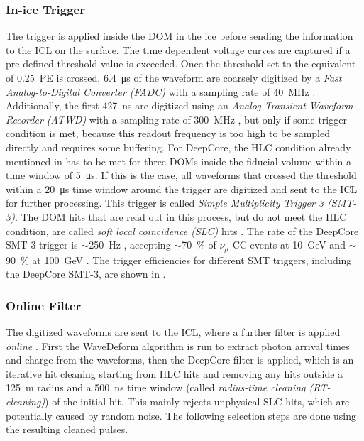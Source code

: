 \subsubsection{In-ice Trigger} 

The trigger is applied inside the DOM in the ice before sending the information to the ICL on the surface. The time dependent voltage curves are captured if a pre-defined threshold value is exceeded. Once the threshold set to the equivalent of \SI{0.25}{PE} is crossed, \SI{6.4}{\micro\second} of the waveform are coarsely digitized by a \textit{Fast Analog-to-Digital Converter (FADC)} with a sampling rate of \SI{40}{\mega\hertz} . Additionally, the first \SI{427}{\nano\second} are digitized using an \textit{Analog Transient Waveform Recorder (ATWD)} with a sampling rate of \SI{300}{\mega\hertz} , but only if some trigger condition is met, because this readout frequency is too high to be sampled directly and requires some buffering. For DeepCore, the HLC condition already mentioned in  has to be met for three DOMs inside the fiducial volume within a time window of \SI{5}{\micro\second}. If this is the case, all waveforms that crossed the threshold within a \SI{20}{\micro\second} time window around the trigger are digitized and sent to the ICL for further processing. This trigger is called \textit{Simple Multiplicity Trigger 3 (SMT-3)}. The DOM hits that are read out in this process, but do not meet the HLC condition, are called \textit{soft local coincidence (SLC)} hits . The rate of the DeepCore SMT-3 trigger is $\sim$\SI{250}{\hertz} , accepting $\sim$\SI{70}{\percent} of $\nu_\mu$-CC events at \SI{10}{\giga\electronvolt} and $\sim$\SI{90}{\percent} at \SI{100}{\giga\electronvolt} . The trigger efficiencies for different SMT triggers, including the DeepCore SMT-3, are shown in . 


\subsubsection{Online Filter} 

The digitized waveforms are sent to the ICL, where a further filter is applied \textit{online} . First the WaveDeform algorithm is run to extract photon arrival times and charge from the waveforms, then the DeepCore filter is applied, which is an iterative hit cleaning starting from HLC hits and removing any hits outside a \SI{125}{\meter} radius and a \SI{500}{\nano\second} time window (called \textit{radius-time cleaning (RT-cleaning)}) of the initial hit. This mainly rejects unphysical SLC hits, which are potentially caused by random noise. The following selection steps are done using the resulting cleaned pulses.

